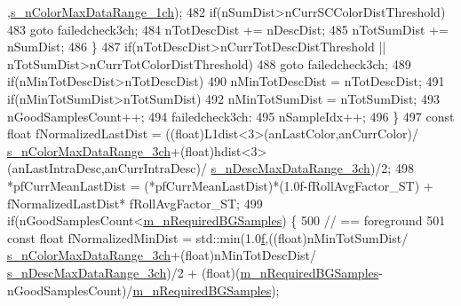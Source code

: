 \begin{DoxyCode}
      ,\mbox{\hyperlink{_background_subtractor_su_b_s_e_n_s_e_8cpp_ad0ce3de05453a1b3738f711d9955031f}{s\_nColorMaxDataRange\_1ch}});
482                     \textcolor{keywordflow}{if}(nSumDist>nCurrSCColorDistThreshold)
483                         \textcolor{keywordflow}{goto} failedcheck3ch;
484                     nTotDescDist += nDescDist;
485                     nTotSumDist += nSumDist;
486                 \}
487                 \textcolor{keywordflow}{if}(nTotDescDist>nCurrTotDescDistThreshold || nTotSumDist>nCurrTotColorDistThreshold)
488                     \textcolor{keywordflow}{goto} failedcheck3ch;
489                 \textcolor{keywordflow}{if}(nMinTotDescDist>nTotDescDist)
490                     nMinTotDescDist = nTotDescDist;
491                 \textcolor{keywordflow}{if}(nMinTotSumDist>nTotSumDist)
492                     nMinTotSumDist = nTotSumDist;
493                 nGoodSamplesCount++;
494                 failedcheck3ch:
495                 nSampleIdx++;
496             \}
497             \textcolor{keyword}{const} \textcolor{keywordtype}{float} fNormalizedLastDist = ((float)L1dist<3>(anLastColor,anCurrColor)/
      \mbox{\hyperlink{_background_subtractor_su_b_s_e_n_s_e_8cpp_a986ab69736996b917f1e964b2d064aad}{s\_nColorMaxDataRange\_3ch}}+(float)hdist<3>(anLastIntraDesc,anCurrIntraDesc)/
      \mbox{\hyperlink{_background_subtractor_su_b_s_e_n_s_e_8cpp_a5304f7a24033acdfa11a34dcb3d2720e}{s\_nDescMaxDataRange\_3ch}})/2;
498             *pfCurrMeanLastDist = (*pfCurrMeanLastDist)*(1.0f-fRollAvgFactor\_ST) + fNormalizedLastDist*
      fRollAvgFactor\_ST;
499             \textcolor{keywordflow}{if}(nGoodSamplesCount<\mbox{\hyperlink{class_background_subtractor_su_b_s_e_n_s_e_aca07c4307021623f9055832506cad1d6}{m\_nRequiredBGSamples}}) \{
500                 \textcolor{comment}{// == foreground}
501                 \textcolor{keyword}{const} \textcolor{keywordtype}{float} fNormalizedMinDist = std::min(1.0\mbox{\hyperlink{rings_8cpp_a77369fc4d5326a16d2c603e032023528}{f}},((\textcolor{keywordtype}{float})nMinTotSumDist/
      \mbox{\hyperlink{_background_subtractor_su_b_s_e_n_s_e_8cpp_a986ab69736996b917f1e964b2d064aad}{s\_nColorMaxDataRange\_3ch}}+(\textcolor{keywordtype}{float})nMinTotDescDist/
      \mbox{\hyperlink{_background_subtractor_su_b_s_e_n_s_e_8cpp_a5304f7a24033acdfa11a34dcb3d2720e}{s\_nDescMaxDataRange\_3ch}})/2 + (\textcolor{keywordtype}{float})(\mbox{\hyperlink{class_background_subtractor_su_b_s_e_n_s_e_aca07c4307021623f9055832506cad1d6}{m\_nRequiredBGSamples}}-
      nGoodSamplesCount)/\mbox{\hyperlink{class_background_subtractor_su_b_s_e_n_s_e_aca07c4307021623f9055832506cad1d6}{m\_nRequiredBGSamples}});

\end{DoxyCode}
